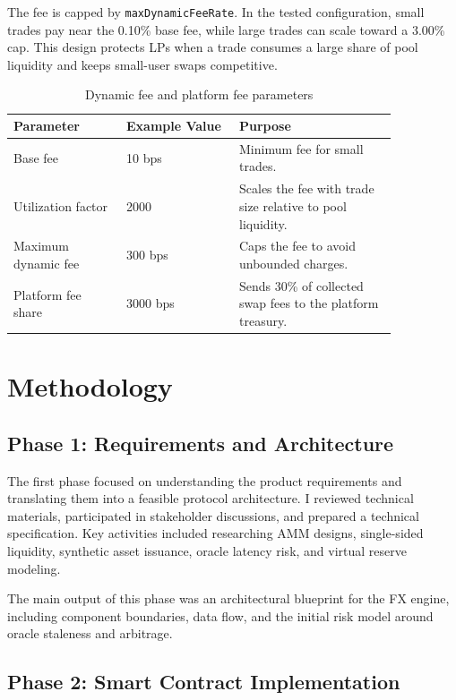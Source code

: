 \documentclass{article}
\begin{document}
The fee is capped by \texttt{maxDynamicFeeRate}. In the tested configuration, small trades pay near the 0.10\% base fee, while large trades can scale toward a 3.00\% cap. This design protects LPs when a trade consumes a large share of pool liquidity and keeps small-user swaps competitive.

\begin{table}[h]
\centering
\begin{tabular}{p{0.25\linewidth} p{0.25\linewidth} p{0.35\linewidth}}
\toprule
\textbf{Parameter} & \textbf{Example Value} & \textbf{Purpose} \\
\midrule
Base fee & 10 bps & Minimum fee for small trades. \\
Utilization factor & 2000 & Scales the fee with trade size relative to pool liquidity. \\
Maximum dynamic fee & 300 bps & Caps the fee to avoid unbounded charges. \\
Platform fee share & 3000 bps & Sends 30\% of collected swap fees to the platform treasury. \\
\bottomrule
\end{tabular}
\caption{Dynamic fee and platform fee parameters}
\end{table}

\section{Methodology}

\subsection{Phase 1: Requirements and Architecture}

The first phase focused on understanding the product requirements and translating them into a feasible protocol architecture. I reviewed technical materials, participated in stakeholder discussions, and prepared a technical specification. Key activities included researching AMM designs, single-sided liquidity, synthetic asset issuance, oracle latency risk, and virtual reserve modeling.

The main output of this phase was an architectural blueprint for the FX engine, including component boundaries, data flow, and the initial risk model around oracle staleness and arbitrage.

\subsection{Phase 2: Smart Contract Implementation}
\end{document}
